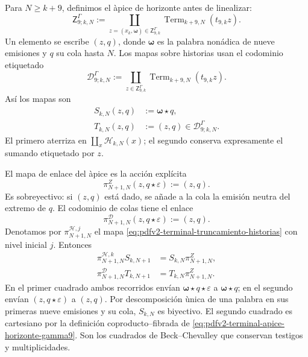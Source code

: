 Para \(N\geq k+9\), definimos el \`apice de horizonte antes de linealizar:
\begin{equation}
\label{eq:pdfv2-terminal-apice-horizonte-gamma9}
 \mathsf Z^\Gamma_{9;k,N}:=
 \coprod_{z=(\widehat x_k,\boldsymbol\omega)
            \in\mathsf Z^\Gamma_{9,k}}
 \operatorname{Term}_{k+9,N}(t_{9,k}z).
\end{equation}
Un elemento se escribe \((z,q)\), donde \(\boldsymbol\omega\) es la palabra
non\'adica de nueve emisiones y \(q\) su cola hasta \(N\). Los mapas sobre
historias usan el codominio etiquetado
\begin{equation}
\label{eq:pdfv2-terminal-gamma9-codominio-colas}
 \mathscr D^\Gamma_{9;k,N}:=
 \coprod_{z\in\mathsf Z^\Gamma_{9,k}}
 \operatorname{Term}_{k+9,N}(t_{9,k}z).
\end{equation}
Así los mapas son
\begin{align}
 S_{k,N}(z,q)&:=\boldsymbol\omega\star q,
 \label{eq:pdfv2-terminal-gamma9-s-horizonte}\\
 T_{k,N}(z,q)&:=(z,q)\in\mathscr D^\Gamma_{9;k,N}.
 \label{eq:pdfv2-terminal-gamma9-t-horizonte}
\end{align}
El primero aterriza en
\(\coprod_x\mathscr H_{k,N}(x)\); el segundo conserva expresamente el
sumando etiquetado por \(z\).

El mapa de enlace del \`apice es la acci\'on expl\'icita
\begin{equation}
\label{eq:pdfv2-terminal-gamma9-enlace-apice}
 \pi^Z_{N+1,N}(z,q\star\varepsilon):=(z,q).
\end{equation}
Es sobreyectivo: si \((z,q)\) est\'a dado, se a\~nade a la cola la emisi\'on
neutra del extremo de \(q\). El codominio de colas tiene el enlace
\begin{equation}
\label{eq:pdfv2-terminal-gamma9-enlace-codominio}
 \pi^{\mathscr D}_{N+1,N}(z,q\star\varepsilon):=(z,q).
\end{equation}
Denotamos por
\(\pi^{\mathscr H,j}_{N+1,N}\) el mapa
\eqref{eq:pdfv2-terminal-truncamiento-historias} con nivel inicial \(j\).
Entonces
\begin{align}
 \pi^{\mathscr H,k}_{N+1,N}S_{k,N+1}
 &=S_{k,N}\pi^Z_{N+1,N},
 \label{eq:pdfv2-terminal-gamma9-cuadrado-fuente}\\
 \pi^{\mathscr D}_{N+1,N}T_{k,N+1}
 &=T_{k,N}\pi^Z_{N+1,N}.
 \label{eq:pdfv2-terminal-gamma9-cuadrado-destino}
\end{align}
En el primer cuadrado ambos recorridos env\'ian
\(\boldsymbol\omega\star q\star\varepsilon\) a
\(\boldsymbol\omega\star q\); en el segundo env\'ian
\((z,q\star\varepsilon)\) a \((z,q)\). Por descomposici\'on \`unica de una palabra
en sus primeras nueve emisiones y su cola, \(S_{k,N}\) es biyectivo. El
segundo cuadrado es cartesiano por la definici\'on coproducto--fibrada de
\eqref{eq:pdfv2-terminal-apice-horizonte-gamma9}. Son los cuadrados de
Beck--Chevalley que conservan testigos y multiplicidades.

